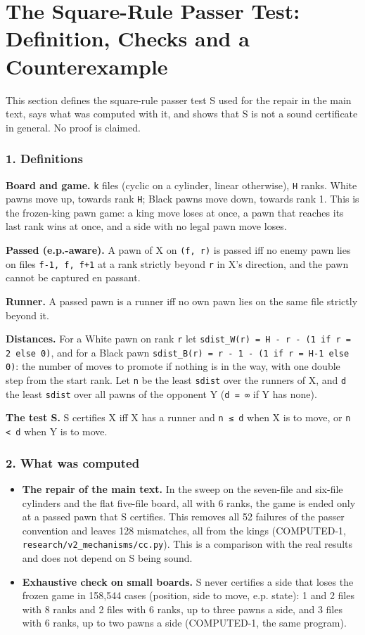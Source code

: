 \section{The Square-Rule Passer Test: Definition, Checks and a Counterexample}\label{S-square}
This section defines the square-rule passer test S used for the repair in the main text, says what was computed with it, and shows that S is not a sound certificate in general. No proof is claimed.

\subsubsection*{1. Definitions}
\textbf{Board and game.} \texttt{k} files (cyclic on a cylinder, linear otherwise), \texttt{H} ranks. White pawns move up, towards rank \texttt{H}; Black pawns move down, towards rank 1. This is the frozen-king pawn game: a king move loses at once, a pawn that reaches its last rank wins at once, and a side with no legal pawn move loses.

\textbf{Passed (e.p.-aware).} A pawn of X on \texttt{(f, r)} is passed iff no enemy pawn lies on files \texttt{f-{}1, f, f+1} at a rank strictly beyond \texttt{r} in X's direction, and the pawn cannot be captured en passant.

\textbf{Runner.} A passed pawn is a runner iff no own pawn lies on the same file strictly beyond it.

\textbf{Distances.} For a White pawn on rank \texttt{r} let \texttt{sdist\_W(r) = H -{} r -{} (1 if r = 2 else 0)}, and for a Black pawn \texttt{sdist\_B(r) = r -{} 1 -{} (1 if r = H-{}1 else 0)}: the number of moves to promote if nothing is in the way, with one double step from the start rank. Let \texttt{n} be the least \texttt{sdist} over the runners of X, and \texttt{d} the least \texttt{sdist} over all pawns of the opponent Y (\texttt{d = \textrm{∞}} if Y has none).

\textbf{The test S.} S certifies X iff X has a runner and \texttt{n \textrm{≤} d} when X is to move, or \texttt{n \textless{} d} when Y is to move.

\subsubsection*{2. What was computed}
\begin{itemize}
\item \textbf{The repair of the main text.} In the sweep on the seven-file and six-file cylinders and the flat five-file board, all with 6 ranks, the game is ended only at a passed pawn that S certifies. This removes all 52 failures of the passer convention and leaves 128 mismatches, all from the kings (COMPUTED-1, \texttt{research/v2\_mechanisms/cc.py}). This is a comparison with the real results and does not depend on S being sound.
\item \textbf{Exhaustive check on small boards.} S never certifies a side that loses the frozen game in 158,544 cases (position, side to move, e.p. state): 1 and 2 files with 8 ranks and 2 files with 6 ranks, up to three pawns a side, and 3 files with 6 ranks, up to two pawns a side (COMPUTED-1, the same program).
\end{itemize}
